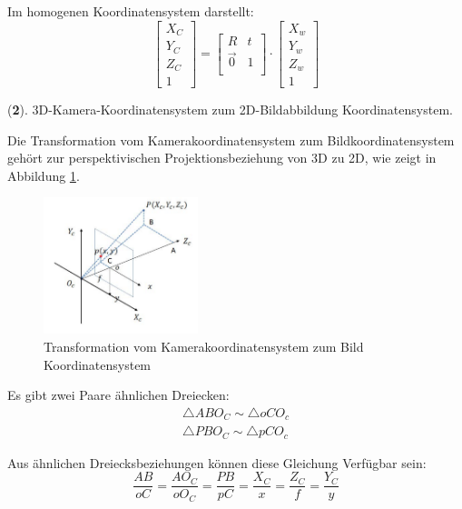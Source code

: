 Im homogenen Koordinatensystem darstellt:
\begin{equation}
   \begin{bmatrix}
	X_C \\  
	Y_C \\
	Z_C \\
	1
	\end{bmatrix} = \begin{bmatrix}
	R & t	\\
	\vec{0}	& 1 \\
	\end{bmatrix} \cdot \begin{bmatrix}
	X_w \\  
	Y_w \\
	Z_w \\
	1
	\end{bmatrix}
\end{equation}

(\textbf{2}). 3D-Kamera-Koordinatensystem zum 2D-Bildabbildung Koordinatensystem.

Die Transformation vom Kamerakoordinatensystem zum Bildkoordinatensystem gehört zur perspektivischen Projektionsbeziehung von 3D zu 2D, wie zeigt in Abbildung \ref{fig:Czuimage}.

\begin{figure}[H]
 \centering 
 \includegraphics[keepaspectratio,width=0.4\textwidth]{images/3_Ersteverfahren/Kamera/Czuimage.pdf}
 \caption{Transformation vom Kamerakoordinatensystem zum Bild Koordinatensystem}
 \label{fig:Czuimage}
\end{figure} 

Es gibt zwei Paare ähnlichen Dreiecken:
\begin{equation}
   \begin{split}
    \triangle ABO_C \sim \triangle oCO_c\\  
	\triangle PBO_C \sim \triangle pCO_c
	\end{split}
\end{equation}

Aus ähnlichen Dreiecksbeziehungen können diese Gleichung Verfügbar sein:
\begin{equation}
   \frac{AB}{oC} = \frac{AO_C}{oO_C} = \frac{PB}{pC} = \frac{X_C}{x} = \frac{Z_C}{f} = \frac{Y_C}{y} 
\end{equation}

